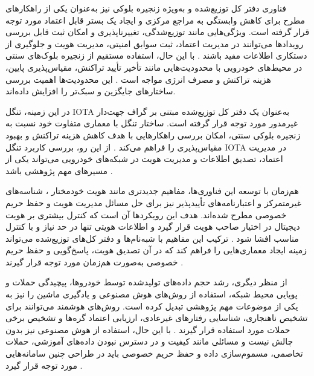 \documentclass[12pt,a4paper]{article}
\begin{document}
فناوری دفتر کل توزیع‌شده  و به‌ویژه زنجیره بلوکی  نیز به‌عنوان یکی از راهکار‌های مطرح برای کاهش وابستگی به مراجع مرکزی و ایجاد یک بستر قابل اعتماد مورد توجه قرار گرفته است. ویژگی‌هایی مانند توزیع‌شدگی، تغییرناپذیری و امکان ثبت قابل بررسی رویداد‌ها می‌توانند در مدیریت اعتماد، ثبت سوابق امنیتی، مدیریت هویت و جلوگیری از دستکاری اطلاعات مفید باشند \cite{razaBlockchainBasedReputationTrust2024,fengBPASBlockchainAssistedPrivacyPreserving2020}. با این حال، استفاده مستقیم از زنجیره بلوک‌های سنتی در محیط‌های خودرویی با محدودیت‌هایی مانند تأخیر تأیید تراکنش، مقیاس‌پذیری پایین، هزینه تراکنش و مصرف انرژی مواجه است \cite{razaBlockchainBasedReputationTrust2024,ghovanlooyghajarSBTMSScalableBlockchain2021,IOTATANGLE20}. این محدودیت‌ها اهمیت بررسی ساختار‌های جایگزین و سبک‌تر را افزایش داده‌اند.

در این زمینه، تنگل IOTA  به‌عنوان یک دفتر کل توزیع‌شده مبتنی بر گراف جهت‌دار غیرمدور  مورد توجه قرار گرفته است. ساختار تنگل با معماری متفاوت خود نسبت به زنجیره بلوکی سنتی، امکان بررسی راهکار‌هایی با هدف کاهش هزینه تراکنش و بهبود مقیاس‌پذیری را فراهم می‌کند \cite{IOTATANGLE20,silvanoIotaTangleCryptocurrency2020}. از این رو، بررسی کاربرد تنگل IOTA در مدیریت اعتماد، تصدیق اطلاعات و مدیریت هویت در شبکه‌های خودرویی می‌تواند یکی از مسیر‌های مهم پژوهشی باشد \cite{IOTATANGLE20,silvanoIotaTangleCryptocurrency2020,feraudoDIVADIDbasedReputation2024}.

هم‌زمان با توسعه این فناوری‌ها، مفاهیم جدیدتری مانند هویت خودمختار ، شناسه‌های غیرمتمرکز  و اعتبارنامه‌های تأییدپذیر  نیز برای حل مسائل مدیریت هویت و حفظ حریم خصوصی مطرح شده‌اند. هدف این رویکرد‌ها آن است که کنترل بیشتری بر هویت دیجیتال در اختیار صاحب هویت قرار گیرد و اطلاعات هویتی تنها در حد نیاز و با کنترل مناسب افشا شود \cite{mazzocca2025survey}. ترکیب این مفاهیم با شبه‌نام‌ها و دفتر کل‌های توزیع‌شده می‌تواند زمینه ایجاد معماری‌هایی را فراهم کند که در آن تصدیق هویت، پاسخ‌گویی و حفظ حریم خصوصی به‌صورت هم‌زمان مورد توجه قرار گیرند \cite{mazzocca2025survey,feraudoDIVADIDbasedReputation2024}.

از منظر دیگری، رشد حجم داده‌های تولیدشده توسط خودروها، پیچیدگی حملات و پویایی محیط شبکه، استفاده از روش‌های هوش مصنوعی و یادگیری ماشین  را نیز به یکی از موضوعات مهم پژوهشی تبدیل کرده است. روش‌های هوشمند می‌توانند برای تشخیص ناهنجاری، شناسایی رفتار‌های غیرعادی، ارزیابی اعتماد گره‌ها و تشخیص برخی حملات مورد استفاده قرار گیرند \cite{farsimadanReviewSecurityChallenges2025}. با این حال، استفاده از هوش مصنوعی نیز بدون چالش نیست و مسائلی مانند کیفیت و در دسترس نبودن داده‌های آموزشی، حملات تخاصمی، مسموم‌سازی داده و حفظ حریم خصوصی باید در طراحی چنین سامانه‌هایی مورد توجه قرار گیرد \cite{farsimadanReviewSecurityChallenges2025}.
\end{document}
